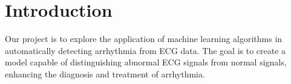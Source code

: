 \section{Introduction}
Our project is to explore the application of machine learning algorithms in automatically detecting arrhythmia from ECG data. The goal is to create a model capable of distinguishing abnormal ECG signals from normal signals, enhancing the diagnosis and treatment of arrhythmia.
